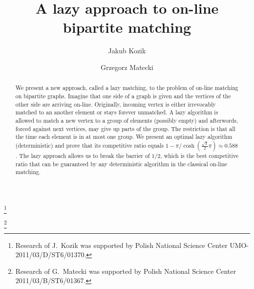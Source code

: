 \documentclass[12pt]{amsart}
\theoremstyle{definition}
\begin{document}
\title{A lazy approach to on-line bipartite matching}

\author[J.\ Kozik]{Jakub Kozik} 
\thanks{Research of J.\ Kozik was supported by Polish National Science Center UMO-2011/03/D/ST6/01370.}

\author[G.\ Matecki]{Grzegorz Matecki}
\thanks{Research of G.\ Matecki was supported by Polish National Science Center 2011/03/B/ST6/01367.}
\address{
  Theoretical Computer Science\\
  Faculty of Mathematics and
  Computer Science\\Jagiellonian University in Krak\'{o}w\\
Poland}




\begin{abstract}
We present a new approach, called a lazy matching, to the problem of on-line matching on bipartite graphs.
Imagine that one side of a graph is given and the vertices of the other side are arriving on-line.
Originally, incoming vertex is either irrevocably matched to an another element or stays forever unmatched.
A lazy algorithm is allowed to match a new vertex to a group of elements (possibly empty) and afterwords, forced against next vertices, may give up parts of the group. 
The restriction is that all the time each element is in at most one group.
We present an optimal lazy algorithm (deterministic) and prove that its competitive ratio equals $1-\pi/\cosh(\frac{\sqrt{3}}{2}\pi)\approx 0.588$.
The lazy approach allows us to break the barrier of $1/2$, which is the best  competitive ratio that can be guaranteed by any deterministic algorithm in the classical on-line matching.
\end{abstract}

\maketitle
\end{document}
